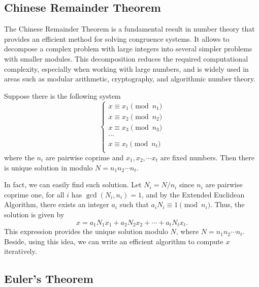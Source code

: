 \documentclass[../lecture-notes-148x210.tex]{subfiles}
\begin{document}
\subsection{Chinese Remainder Theorem}
The Chinese Remainder Theorem is a fundamental result in number theory
that provides an efficient method for solving congruence systems. It allows to
decompose a complex problem with large integers into several simpler 
problems with smaller modules. This decomposition reduces the required computational 
complexity, especially when working with large numbers, and is widely used 
in areas such as modular arithmetic, cryptography, and algorithmic number theory. 

\begin{theorem}  \label{th:chinese_remainder_theorem}
    Suppose there is the following system
    \begin{equation*}    
        \begin{cases}
            x \equiv x_1 \pmod{n_1} \\
            x \equiv x_2 \pmod{n_2} \\
            x \equiv x_3 \pmod{n_3} \\
            \cdots \\
            x \equiv x_t \pmod{n_t} \\
        \end{cases}
    \end{equation*}
    where the $n_i$ are pairwise coprime and $x_1, x_2, \cdots x_t$ are fixed numbers. 
    Then there is unique solution in modulo $N = n_1n_2 \cdots n_t$.
\end{theorem}

In fact, we can easily find such solution. Let $N_i = N/n_i$ since $n_i$ are pairwise coprime one, 
for all $i$ has $\gcd(N_i, n_i) = 1$, and by the Extended Euclidean Algorithm, there exists an integer
$a_i$ such that $a_iN_i \equiv 1 \pmod{n_i}$. Thus, the solution is given by 
\begin{equation*}
    x = a_1N_1x_1 + a_2N_2x_2 + \cdots + a_tN_tx_t .
\end{equation*}
This expression provides the unique solution modulo \( N \), where \( N = n_1 n_2 \cdots n_t \). 
Beside, using this idea, we can write an efficient algorithm to compute \( x \) iteratively.

\subsection{Euler's Theorem}
\end{document}

